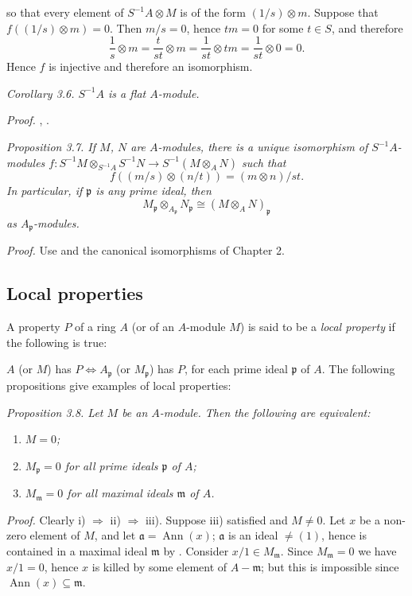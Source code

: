 
so that every element of $S^{-1}A\otimes M$ is of the form $(1/s)\otimes m$. Suppose that $f((1/s)\otimes m)=0$. Then $m/s=0$, hence $tm=0$ for some $t\in S$, and therefore
\[
 \frac1s\otimes m=\frac{t}{st}\otimes m=\frac1{st}\otimes tm=\frac1{st}\otimes0=0.
\]
Hence $f$ is injective and therefore an isomorphism. \proofbox

\noindent\textit{Corollary 3.6. $S^{-1}A$ is a flat $A$-module.}

\noindent\textit{Proof.} , . \proofbox

\noindent\textit{Proposition 3.7. If $M$, $N$ are $A$-modules, there is a unique isomorphism of $S^{-1}A$-modules $f:S^{-1}M\otimes_{S^{-1}A}S^{-1}N\longrightarrow S^{-1}(M\otimes_A N)$ such that}
\[
 f((m/s)\otimes(n/t))=(m\otimes n)/st.
\]
\textit{In particular, if $\mathfrak p$ is any prime ideal, then}
\[
 M_{\mathfrak p}\otimes_{A_{\mathfrak p}}N_{\mathfrak p}\cong(M\otimes_A N)_{\mathfrak p}
\]
\textit{as $A_{\mathfrak p}$-modules.}

\noindent\textit{Proof.} Use  and the canonical isomorphisms of Chapter 2. \proofbox

\subsection{Local properties}

A property $P$ of a ring $A$ (or of an $A$-module $M$) is said to be a \textit{local property} if the following is true:

$A$ (or $M$) has $P\Longleftrightarrow A_{\mathfrak p}$ (or $M_{\mathfrak p}$) has $P$, for each prime ideal $\mathfrak p$ of $A$. The following propositions give examples of local properties:

\noindent\textit{Proposition 3.8. Let $M$ be an $A$-module. Then the following are equivalent:}
\begin{enumerate}
\renewcommand{\labelenumi}{\roman{enumi})}
\item \textit{$M=0$;}
\item \textit{$M_{\mathfrak p}=0$ for all prime ideals $\mathfrak p$ of $A$;}
\item \textit{$M_{\mathfrak m}=0$ for all maximal ideals $\mathfrak m$ of $A$.}
\end{enumerate}

\noindent\textit{Proof.} Clearly i) $\Rightarrow$ ii) $\Rightarrow$ iii). Suppose iii) satisfied and $M\neq0$. Let $x$ be a non-zero element of $M$, and let $\mathfrak a=\operatorname{Ann}(x)$; $\mathfrak a$ is an ideal $\neq(1)$, hence is contained in a maximal ideal $\mathfrak m$ by . Consider $x/1\in M_{\mathfrak m}$. Since $M_{\mathfrak m}=0$ we have $x/1=0$, hence $x$ is killed by some element of $A-\mathfrak m$; but this is impossible since $\operatorname{Ann}(x)\subseteq\mathfrak m$. \proofbox

